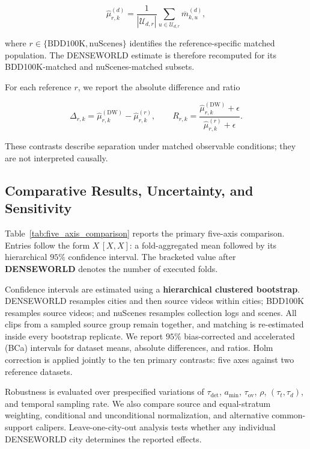 \[
\widehat\mu_{r,k}^{(d)}
=
\frac{1}{|\mathcal U_{d,r}|}
\sum_{u\in\mathcal U_{d,r}}
\overline m_{k,u}^{(d)},
\]

where \(r\in\{\mathrm{BDD100K},\mathrm{nuScenes}\}\) identifies the
reference-specific matched population. The DENSEWORLD estimate is
therefore recomputed for its BDD100K-matched and nuScenes-matched
subsets.

For each reference \(r\), we report the absolute difference and ratio

\[
\Delta_{r,k}
=
\widehat\mu_{r,k}^{(\mathrm{DW})}
-
\widehat\mu_{r,k}^{(r)},
\qquad
R_{r,k}
=
\frac{
\widehat\mu_{r,k}^{(\mathrm{DW})}+\epsilon
}{
\widehat\mu_{r,k}^{(r)}+\epsilon
}.
\]

These contrasts describe separation under matched observable
conditions; they are not interpreted causally.


\subsection{Comparative Results, Uncertainty, and Sensitivity}
\label{app:five_axis_results}

Table~\ref{tab:five_axis_comparison} reports the primary five-axis
comparison. Entries follow the form \(X\,[X,X]\): a fold-aggregated
mean followed by its hierarchical \(95\%\) confidence interval. The
bracketed value after \textbf{DENSEWORLD} denotes the number of
executed folds.



Confidence intervals are estimated using a
\textbf{hierarchical clustered bootstrap}. DENSEWORLD resamples cities
and then source videos within cities; BDD100K resamples source videos;
and nuScenes resamples collection logs and scenes. All clips from a
sampled source group remain together, and matching is re-estimated
inside every bootstrap replicate. We report \(95\%\)
bias-corrected and accelerated (BCa) intervals for dataset means,
absolute differences, and ratios. Holm correction is applied jointly
to the ten primary contrasts: five axes against two reference datasets.

Robustness is evaluated over prespecified variations of
\(\tau_{\mathrm{det}}\), \(a_{\min}\), \(\tau_{\mathrm{ov}}\),
\(\rho\), \((\tau_t,\tau_d)\), and temporal sampling rate. We also
compare source and equal-stratum weighting, conditional and
unconditional normalization, and alternative common-support calipers.
Leave-one-city-out analysis tests whether any individual DENSEWORLD
city determines the reported effects.

